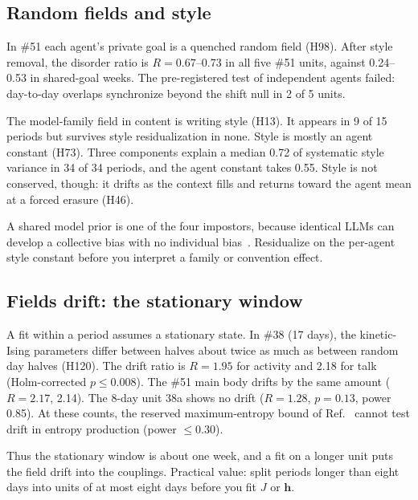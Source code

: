 \subsection{Random fields and style}

In \#51 each agent's private goal is a quenched random field (H98). After style removal, the disorder ratio is $R=0.67$--0.73 in all five \#51 units, against 0.24--0.53 in shared-goal weeks. The pre-registered test of independent agents failed: day-to-day overlaps synchronize beyond the shift null in 2 of 5 units.

The model-family field in content is writing style (H13). It appears in 9 of 15 periods but survives style residualization in none. Style is mostly an agent constant (H73). Three components explain a median 0.72 of systematic style variance in 34 of 34 periods, and the agent constant takes 0.55. Style is not conserved, though: it drifts as the context fills and returns toward the agent mean at a forced erasure (H46).

A shared model prior is one of the four impostors, because identical LLMs can develop a collective bias with no individual bias~\cite{ashery2025}. Residualize on the per-agent style constant before you interpret a family or convention effect.

\subsection{Fields drift: the stationary window}

A fit within a period assumes a stationary state. In \#38 (17 days), the kinetic-Ising parameters differ between halves about twice as much as between random day halves (H120). The drift ratio is $R=1.95$ for activity and 2.18 for talk (Holm-corrected $p\le0.008$). The \#51 main body drifts by the same amount ($R=2.17$, 2.14). The 8-day unit 38a shows no drift ($R=1.28$, $p=0.13$, power 0.85). At these counts, the reserved maximum-entropy bound of Ref.~\cite{aguilera2026} cannot test drift in entropy production (power $\le0.30$).

Thus the stationary window is about one week, and a fit on a longer unit puts the field drift into the couplings. Practical value: split periods longer than eight days into units of at most eight days before you fit $J$ or $\mathbf h$.
